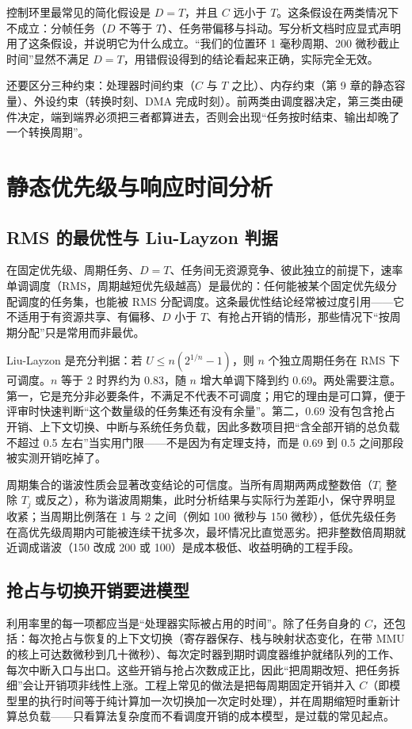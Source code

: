 \documentclass[12pt,a4paper,fontset=fandol]{ctexbook}
\begin{document}
控制环里最常见的简化假设是 $D = T$，并且 $C$ 远小于 $T$。这条假设在两类情况下不成立：分帧任务（$D$ 不等于 $T$）、任务带偏移与抖动。写分析文档时应显式声明用了这条假设，并说明它为什么成立。“我们的位置环 1 毫秒周期、200 微秒截止时间”显然不满足 $D = T$，用错假设得到的结论看起来正确，实际完全无效。

还要区分三种约束：处理器时间约束（$C$ 与 $T$ 之比）、内存约束（第 9 章的静态容量）、外设约束（转换时刻、DMA 完成时刻）。前两类由调度器决定，第三类由硬件决定，端到端界必须把三者都算进去，否则会出现“任务按时结束、输出却晚了一个转换周期”。

\section{静态优先级与响应时间分析}

\subsection*{RMS 的最优性与 Liu-Layzon 判据}

在固定优先级、周期任务、$D = T$、任务间无资源竞争、彼此独立的前提下，速率单调调度（RMS，周期越短优先级越高）是最优的：任何能被某个固定优先级分配调度的任务集，也能被 RMS 分配调度。这条最优性结论经常被过度引用——它不适用于有资源共享、有偏移、$D$ 小于 $T$、有抢占开销的情形，那些情况下“按周期分配”只是常用而非最优。

Liu-Layzon 是充分判据：若 $U \le n(2^{1/n} - 1)$，则 $n$ 个独立周期任务在 RMS 下可调度。$n$ 等于 2 时界约为 0.83，随 $n$ 增大单调下降到约 0.69。两处需要注意。第一，它是充分非必要条件，不满足不代表不可调度；用它的理由是可口算，便于评审时快速判断“这个数量级的任务集还有没有余量”。第二，0.69 没有包含抢占开销、上下文切换、中断与系统任务负载，因此多数项目把“含全部开销的总负载不超过 0.5 左右”当实用门限——不是因为有定理支持，而是 0.69 到 0.5 之间那段被实测开销吃掉了。

周期集合的谐波性质会显著改变结论的可信度。当所有周期两两成整数倍（$T_i$ 整除 $T_j$ 或反之），称为谐波周期集，此时分析结果与实际行为差距小，保守界明显收紧；当周期比例落在 1 与 2 之间（例如 100 微秒与 150 微秒），低优先级任务在高优先级周期内可能被连续干扰多次，最坏情况比直觉恶劣。把非整数倍周期就近调成谐波（150 改成 200 或 100）是成本极低、收益明确的工程手段。

\subsection*{抢占与切换开销要进模型}

利用率里的每一项都应当是“处理器实际被占用的时间”。除了任务自身的 $C$，还包括：每次抢占与恢复的上下文切换（寄存器保存、栈与映射状态变化，在带 MMU 的核上可达数微秒到几十微秒）、每次定时器到期时调度器维护就绪队列的工作、每次中断入口与出口。这些开销与抢占次数成正比，因此“把周期改短、把任务拆细”会让开销项非线性上涨。工程上常见的做法是把每周期固定开销并入 $C$（即模型里的执行时间等于纯计算加一次切换加一次定时处理），并在周期缩短时重新计算总负载——只看算法复杂度而不看调度开销的成本模型，是过载的常见起点。
\end{document}
